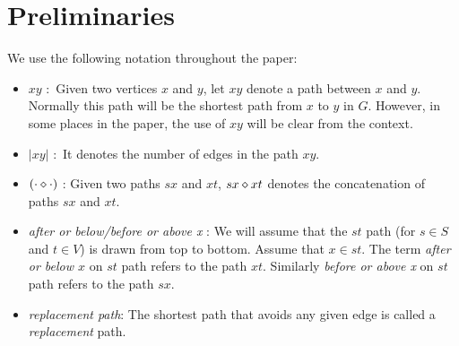 \iflong
\else
\vspace{-2mm}
\fi

\section{Preliminaries}

We use the following notation throughout the paper:

\begin{itemize}[noitemsep,nolistsep]
\item $xy$ :\ Given
two vertices $x$ and $y$, let $xy$ denote a path between
$x$ and $y$. Normally this path will be the shortest path
from $x$ to $y$ in $G$. However, in some places in the paper, the
use of $xy$ will be clear from the context.

\item $|xy|$ :\ It denotes the number of edges in the path
$xy$.

\item $(\cdot \diamond \cdot)$ :  Given two paths
$sx$ and $xt$, $sx \diamond xt$ denotes the concatenation of
paths $sx$ and $xt$.

\item {\em after or below/before or above x} : We will assume that the $st$ path (for $s\in S$ and $t \in V$)  is drawn from top to bottom. Assume that $x \in st$. The term {\em after or below $x$} on $st$ path refers to the path $xt$. Similarly {\em before or above x} on $st$ path refers to the path $sx$.

\item {\em replacement path}: The shortest path that avoids any given edge is called a
{\em replacement} path.
\end{itemize}
